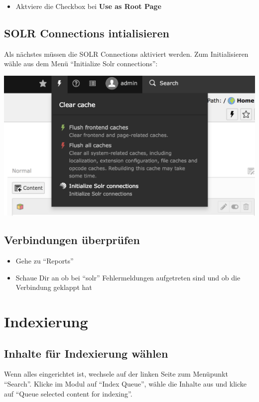 \documentclass[]{book}
\providecommand{\tightlist}{%
  \setlength{\itemsep}{0pt}\setlength{\parskip}{0pt}}
\begin{document}
\begin{itemize}
\tightlist
\item
  Aktviere die Checkbox bei \textbf{Use as Root Page}
\end{itemize}

\section{SOLR Connections intialisieren}

Als nächstes müssen die SOLR Connections aktiviert werden. Zum
Initialisieren wähle aus dem Menü ``Initialize Solr connections'':

\includegraphics{images/solr_connection.png}

\section{Verbindungen überprüfen}

\begin{itemize}
\tightlist
\item
  Gehe zu ``Reports''
\item
  Schaue Dir an ob bei ``solr'' Fehlermeldungen aufgetreten sind und ob
  die Verbindung geklappt hat
\end{itemize}

\chapter{Indexierung}

\section{Inhalte für Indexierung wählen}

Wenn alles eingerichtet ist, wechsele auf der linken Seite zum Menüpunkt
``Search''. Klicke im Modul auf ``Index Queue'', wähle die Inhalte aus
und klicke auf ``Queue selected content for indexing''.
\end{document}
